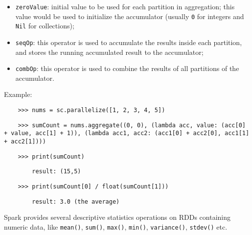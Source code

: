 \begin{itemize}

    \item \texttt{zeroValue}: initial value to be used for each partition in aggregation; this value would be used to initialize the accumulator (usually \texttt{0} for integers and \texttt{Nil} for collections);

    \item \texttt{seqOp}: this operator is used to accumulate the results inside each partition, and stores the running accumulated result to the accumulator;

    \item \texttt{combOp}: this operator is used to combine the results of all partitions of the accumulator.

\end{itemize}

Example:

\begin{lstlisting}
    >>> nums = sc.parallelize([1, 2, 3, 4, 5])
\end{lstlisting}

\begin{lstlisting}
    >>> sumCount = nums.aggregate((0, 0), (lambda acc, value: (acc[0] + value, acc[1] + 1)), (lambda acc1, acc2: (acc1[0] + acc2[0], acc1[1] + acc2[1])))
\end{lstlisting}

\begin{lstlisting}
    >>> print(sumCount)
\end{lstlisting}

\begin{lstlisting}
        result: (15,5)
\end{lstlisting}

\begin{lstlisting}
    >>> print(sumCount[0] / float(sumCount[1]))
\end{lstlisting}

\begin{lstlisting}
        result: 3.0 (the average)
\end{lstlisting}


Spark provides several descriptive statistics operations on RDDs containing numeric data, like \texttt{mean()}, \texttt{sum()}, \texttt{max()}, \texttt{min()}, \texttt{variance()}, \texttt{stdev()} etc.
